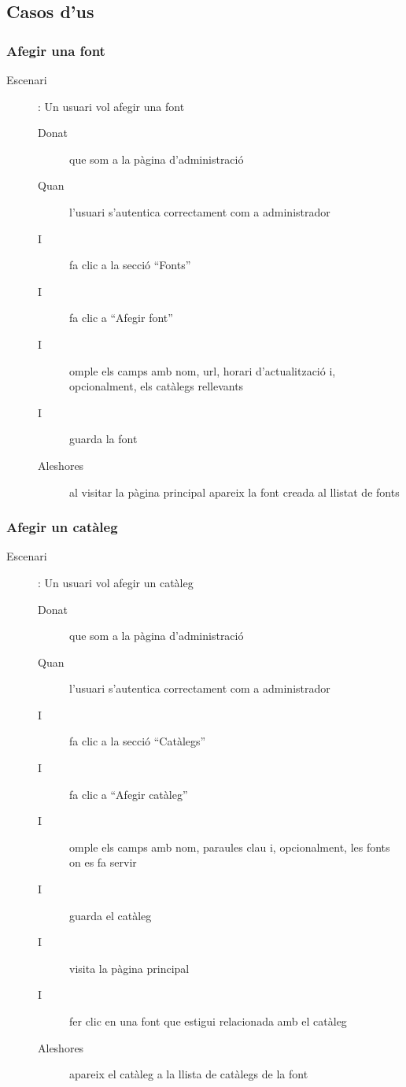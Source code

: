 \documentclass{article}
\begin{document}
\newpage

\subsection{Casos d'us}



\subsubsection{Afegir una font}

\begin{description}
    \item[Escenari]: Un usuari vol afegir una font
    \begin{description}
        \item[Donat] que som a la pàgina d'administració
        \item[Quan] l'usuari s'autentica correctament com a administrador
        \item[I] fa clic a la secció ``Fonts''
        \item[I] fa clic a ``Afegir font''
        \item[I] omple els camps amb nom, url, horari d'actualització i, opcionalment, els catàlegs rellevants
        \item[I] guarda la font
        \item[Aleshores] al visitar la pàgina principal apareix la font creada al llistat de fonts
    \end{description}
\end{description}

\subsubsection{Afegir un catàleg}

\begin{description}
    \item[Escenari]: Un usuari vol afegir un catàleg
    \begin{description}
        \item[Donat] que som a la pàgina d'administració
        \item[Quan] l'usuari s'autentica correctament com a administrador
        \item[I] fa clic a la secció ``Catàlegs''
        \item[I] fa clic a ``Afegir catàleg''
        \item[I] omple els camps amb nom, paraules clau i, opcionalment, les fonts on es fa servir
        \item[I] guarda el catàleg
        \item[I] visita la pàgina principal
        \item[I] fer clic en una font que estigui relacionada amb el catàleg
        \item[Aleshores] apareix el catàleg a la llista de catàlegs de la font
    \end{description}
\end{description}
\end{document}
